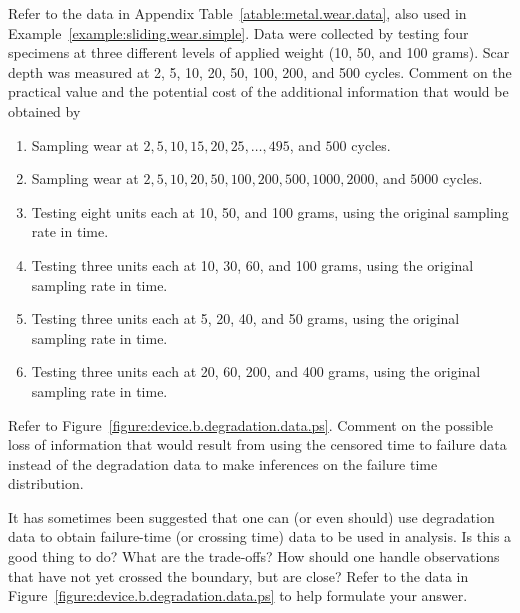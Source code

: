 \begin{exercise}
Refer to the data in Appendix Table~\ref{atable:metal.wear.data},
also used in Example~\ref{example:sliding.wear.simple}. Data were
collected by testing four specimens at three different levels of
applied weight (10, 50, and 100 grams). Scar depth was measured at
2, 5, 10, 20, 50, 100, 200, and 500 cycles. Comment on the practical
value and the potential cost of the additional information that
would be obtained by
\begin{enumerate}
\item
Sampling wear at $2,5,10,15,20,25, \dots, 495$, and $500$ cycles.
\item
Sampling wear at $2, 5, 10, 20, 50, 100,
200, 500, 1000, 2000$, and $5000$ cycles.
\item
Testing eight units each at 10, 50, and 100 grams, using the original
sampling rate in time.
\item
Testing three units each at 10, 30, 60, and 100 grams, using the original
sampling rate in time.
\item
Testing three units each at 5, 20, 40, and 50 grams, using the original
sampling rate in time.
\item
Testing  three units each at 20, 60, 200, and 400 grams, using the original
sampling rate in time.
\end{enumerate}
\end{exercise}


\begin{exercise}
Refer to Figure~\ref{figure:device.b.degradation.data.ps}.
Comment on the possible loss of information that would result from
using the censored time to failure data instead of the degradation
data to make inferences on the failure time distribution.
\end{exercise}

\begin{exercise}
It has sometimes been suggested that one can (or even should) use
degradation data to obtain failure-time (or crossing time) data to be
used in analysis. Is this a good thing to do?  What are the trade-offs?
How should one handle observations that have not yet crossed the
boundary, but are close?  Refer to the data in
Figure~\ref{figure:device.b.degradation.data.ps} to help formulate
your answer.
\end{exercise}

